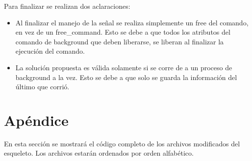 \documentclass[a4paper, 12pt]{article}
\begin{document}
		Para finalizar se realizan dos aclaraciones:
		\begin{itemize}
			\item Al finalizar el manejo de la señal se realiza simplemente un free del comando, en vez de un free\_command. Esto se debe a que todos los atributos del comando de background que deben liberarse, se liberan al finalizar la ejecución del comando. 
			\item La solución propuesta es válida solamente si se corre de a un proceso de background a la vez. Esto se debe a que solo se guarda la información del último que corrió. 
		\end{itemize}
		
	\newpage
	\section{Apéndice}
	En esta sección se mostrará el código completo de los archivos modificados del esqueleto. Los archivos estarán ordenados por orden alfabético.\\
	
	
	\bigskip\bigskip\bigskip
	
	\bigskip\bigskip\bigskip
	
	\bigskip\bigskip\bigskip
	
	\bigskip\bigskip\bigskip
	
	\bigskip\bigskip\bigskip
	
	
	
			
\end{document}
